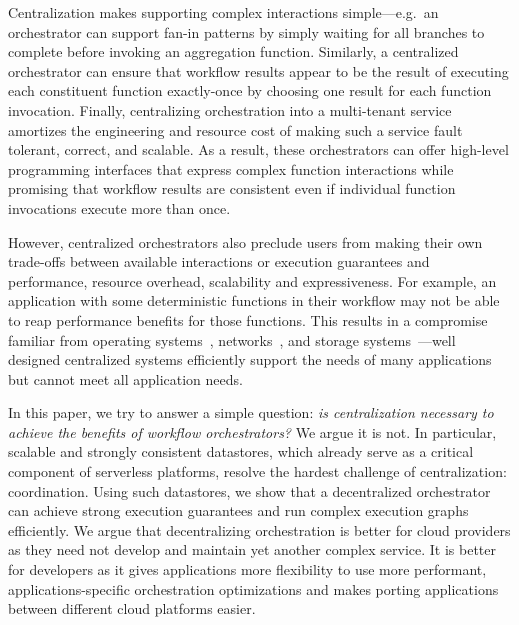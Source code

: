 Centralization makes supporting complex interactions simple---e.g.\ an
orchestrator can support fan-in patterns by simply waiting for all branches to
complete before invoking an aggregation function. Similarly, a centralized
orchestrator can ensure that workflow results appear to be the result of
executing each constituent function exactly-once by choosing one result for
each function invocation. Finally, centralizing orchestration into a
multi-tenant service amortizes the engineering and resource cost of making such
a service fault tolerant, correct, and scalable. As a result, these
orchestrators can offer high-level programming interfaces that express complex
function interactions while promising that workflow results are consistent even
if individual function invocations execute more than once.


However, centralized orchestrators also preclude users from making their own
trade-offs between available interactions or execution guarantees and
performance, resource overhead, scalability and expressiveness. For example, an
application with some deterministic functions in their workflow may not be able
to reap performance benefits for those functions. This results in a compromise
familiar from operating systems~\cite{exokernel,spin},
networks~\cite{active-networks,sdn}, and storage
systems~\cite{comet,splinter}---well designed centralized systems efficiently
support the needs of many applications but cannot meet all application needs.
%

In this paper, we try to answer a simple question: \textit{is centralization
necessary to achieve the benefits of workflow  orchestrators?} We argue
it is not. In particular, scalable and strongly consistent datastores, which already serve as a critical component of serverless platforms, resolve the hardest
challenge of centralization: coordination. Using such datastores, we show that a
decentralized orchestrator can achieve strong execution guarantees and run
complex execution graphs efficiently. We argue that decentralizing orchestration
is better for cloud providers as they need not develop and maintain yet another
complex service. It is better for developers as it gives applications more
flexibility to use more performant, applications-specific orchestration
optimizations and makes porting applications between different cloud platforms
easier.

